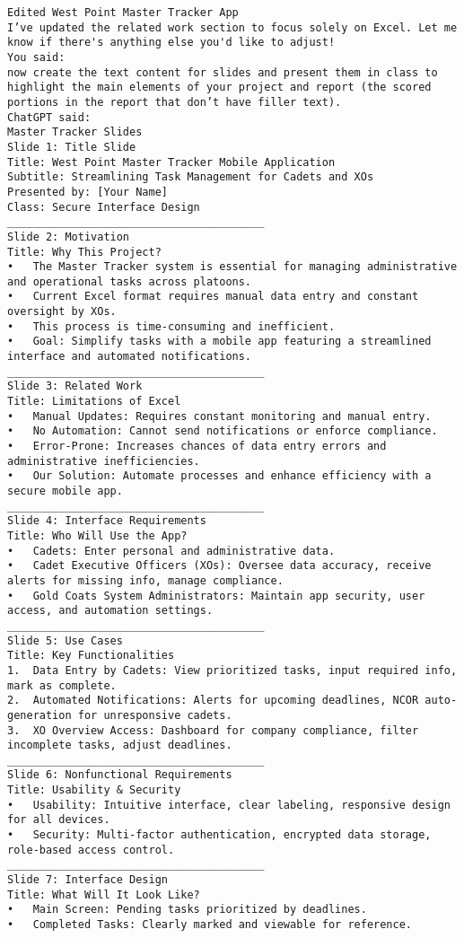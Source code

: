 \documentclass [11pt]{article}
\begin{document}
\begin{lstlisting}
Edited West Point Master Tracker App
I’ve updated the related work section to focus solely on Excel. Let me know if there's anything else you'd like to adjust!
You said:
now create the text content for slides and present them in class to highlight the main elements of your project and report (the scored portions in the report that don’t have filler text).
ChatGPT said:
Master Tracker Slides
Slide 1: Title Slide
Title: West Point Master Tracker Mobile Application
Subtitle: Streamlining Task Management for Cadets and XOs
Presented by: [Your Name]
Class: Secure Interface Design
________________________________________
Slide 2: Motivation
Title: Why This Project?
•	The Master Tracker system is essential for managing administrative and operational tasks across platoons.
•	Current Excel format requires manual data entry and constant oversight by XOs.
•	This process is time-consuming and inefficient.
•	Goal: Simplify tasks with a mobile app featuring a streamlined interface and automated notifications.
________________________________________
Slide 3: Related Work
Title: Limitations of Excel
•	Manual Updates: Requires constant monitoring and manual entry.
•	No Automation: Cannot send notifications or enforce compliance.
•	Error-Prone: Increases chances of data entry errors and administrative inefficiencies.
•	Our Solution: Automate processes and enhance efficiency with a secure mobile app.
________________________________________
Slide 4: Interface Requirements
Title: Who Will Use the App?
•	Cadets: Enter personal and administrative data.
•	Cadet Executive Officers (XOs): Oversee data accuracy, receive alerts for missing info, manage compliance.
•	Gold Coats System Administrators: Maintain app security, user access, and automation settings.
________________________________________
Slide 5: Use Cases
Title: Key Functionalities
1.	Data Entry by Cadets: View prioritized tasks, input required info, mark as complete.
2.	Automated Notifications: Alerts for upcoming deadlines, NCOR auto-generation for unresponsive cadets.
3.	XO Overview Access: Dashboard for company compliance, filter incomplete tasks, adjust deadlines.
________________________________________
Slide 6: Nonfunctional Requirements
Title: Usability & Security
•	Usability: Intuitive interface, clear labeling, responsive design for all devices.
•	Security: Multi-factor authentication, encrypted data storage, role-based access control.
________________________________________
Slide 7: Interface Design
Title: What Will It Look Like?
•	Main Screen: Pending tasks prioritized by deadlines.
•	Completed Tasks: Clearly marked and viewable for reference.

\end{lstlisting}
\end{document}
